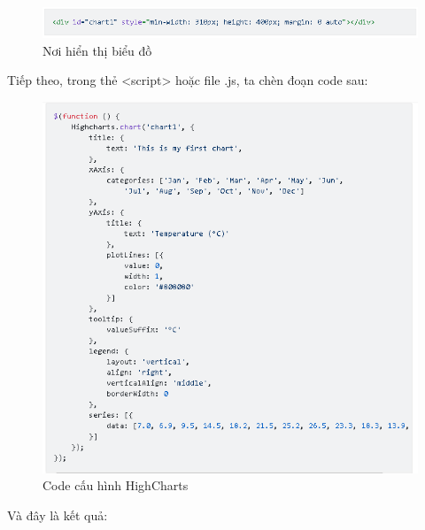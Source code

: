 \begin{center}
	\begin{figure}[htp]
		\begin{center}
			\includegraphics[scale=1]{img/divhighcharts}
		\end{center}
		\caption{Nơi hiển thị biểu đồ}
		\label{refhinh8}
	\end{figure}
\end{center}

Tiếp theo, trong thẻ <script> hoặc file .js, ta chèn đoạn code sau:

\begin{center}
	\begin{figure}[htp]
		\begin{center}
			\includegraphics[scale=1]{img/highcharts}
		\end{center}
		\caption{Code cấu hình HighCharts}
		\label{refhinh9}
	\end{figure}
\end{center}
\vskip 6cm
Và đây là kết quả:
